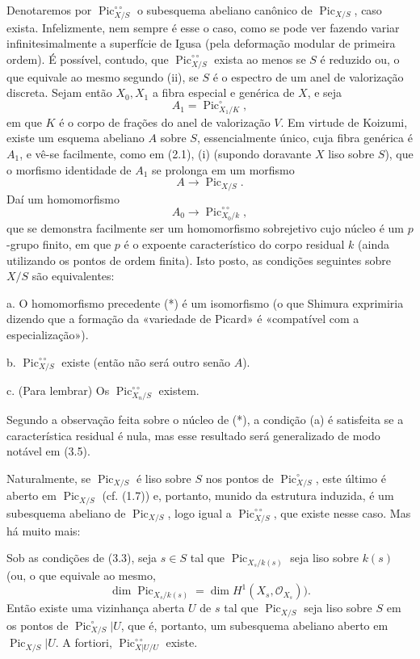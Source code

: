  Denotaremos por
$\operatorname{Pic}_{X/S}^{\circ\circ}$ o subesquema abeliano canônico de
$\operatorname{Pic}_{X/S}$, caso exista. Infelizmente, nem sempre é esse o
caso, como se pode ver fazendo variar infinitesimalmente a superfície de Igusa
(pela deformação modular de primeira ordem). É possível, contudo, que
$\operatorname{Pic}_{X/S}^{\circ\circ}$ exista ao menos se $S$ é reduzido ou,
o que equivale ao mesmo segundo (ii), se $S$ é o espectro de um anel de
valorização discreta. Sejam então $X_0,X_1$ a fibra especial e
genérica de $X$, e seja
\[
A_1=\operatorname{Pic}_{X_1/K}^\circ,
\]
em que $K$ é o corpo de frações do anel de valorização $V$. Em virtude de
Koizumi, existe um esquema abeliano $A$ sobre $S$, essencialmente único, cuja
fibra genérica é $A_1$, e vê-se facilmente, como em (2.1), (i) (supondo
doravante $X$ liso sobre $S$), que o morfismo identidade de $A_1$ se prolonga em um
morfismo
\[
A\longrightarrow\operatorname{Pic}_{X/S}.
\]
Daí um homomorfismo
\[
\tag{*}A_0\longrightarrow\operatorname{Pic}_{X_0/k}^{\circ\circ},
\]
que se demonstra facilmente ser um homomorfismo sobrejetivo cujo núcleo é um
$p$-grupo finito, em que $p$ é o expoente característico do corpo residual $k$
(ainda utilizando os pontos de ordem finita). Isto posto, as condições
seguintes sobre $X/S$ são equivalentes:

\medskip
\noindent a. O homomorfismo precedente (*) é um isomorfismo (o que Shimura
exprimiria dizendo que a formação da «variedade de Picard» é «compatível com a
especialização»).

\noindent b. $\operatorname{Pic}_{X/S}^{\circ\circ}$ existe (então não será
outro senão $A$).

\noindent c. (Para lembrar) Os
$\operatorname{Pic}_{X_n/S}^{\circ\circ}$ existem.

Segundo a observação feita sobre o núcleo de (*), a condição (a) é satisfeita
se a característica residual é nula, mas esse resultado será generalizado de
modo notável em (3.5).

Naturalmente, se $\operatorname{Pic}_{X/S}$ é liso sobre $S$ nos pontos de
$\operatorname{Pic}_{X/S}^\circ$, este último é
aberto em $\operatorname{Pic}_{X/S}$ (cf. (1.7)) e, portanto, munido da
estrutura induzida, é um subesquema abeliano de
$\operatorname{Pic}_{X/S}$, logo igual a
$\operatorname{Pic}_{X/S}^{\circ\circ}$, que existe nesse caso. Mas há muito
mais:

 Sob as condições de (3.3), seja $s\in S$ tal que
$\operatorname{Pic}_{X_s/k(s)}$ seja liso sobre $k(s)$ (ou, o que equivale ao
mesmo,
\[
\dim\operatorname{Pic}_{X_s/k(s)}=\dim H^1(X_s,\mathcal O_{X_s})).
\]
Então existe uma vizinhança aberta $U$ de $s$ tal que
$\operatorname{Pic}_{X/S}$ seja liso sobre $S$ em os pontos de
$\operatorname{Pic}_{X/S}^\circ|U$, que é, portanto, um subesquema abeliano aberto em
$\operatorname{Pic}_{X/S}|U$. A fortiori,
$\operatorname{Pic}_{X|U/U}^{\circ\circ}$ existe.

